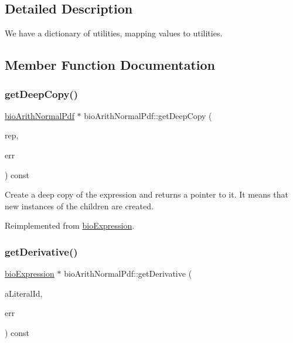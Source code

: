 \subsection{Detailed Description}
We have a dictionary of utilities, mapping values to utilities. 

\subsection{Member Function Documentation}
\mbox{\label{classbio_arith_normal_pdf_af001f9bda79d1518e2c9913c02f98a37}} 
\subsubsection{\texorpdfstring{get\+Deep\+Copy()}{getDeepCopy()}}
{\footnotesize\ttfamily \hyperlink{classbio_arith_normal_pdf}{bio\+Arith\+Normal\+Pdf} $\ast$ bio\+Arith\+Normal\+Pdf\+::get\+Deep\+Copy (\begin{DoxyParamCaption}\item[{\hyperlink{classbio_expression_repository}{bio\+Expression\+Repository} $\ast$}]{rep,  }\item[{pat\+Error $\ast$\&}]{err }\end{DoxyParamCaption}) const\hspace{0.3cm}{\ttfamily [virtual]}}

Create a deep copy of the expression and returns a pointer to it. It means that new instances of the children are created. 

Reimplemented from \hyperlink{classbio_expression_a4ee1b8add634078a02eaae26cd40dcc8}{bio\+Expression}.

\mbox{\label{classbio_arith_normal_pdf_a25ab081a2c88449126a328a5eb635818}} 
\subsubsection{\texorpdfstring{get\+Derivative()}{getDerivative()}}
{\footnotesize\ttfamily \hyperlink{classbio_expression}{bio\+Expression} $\ast$ bio\+Arith\+Normal\+Pdf\+::get\+Derivative (\begin{DoxyParamCaption}\item[{pat\+U\+Long}]{a\+Literal\+Id,  }\item[{pat\+Error $\ast$\&}]{err }\end{DoxyParamCaption}) const\hspace{0.3cm}{\ttfamily [virtual]}}

